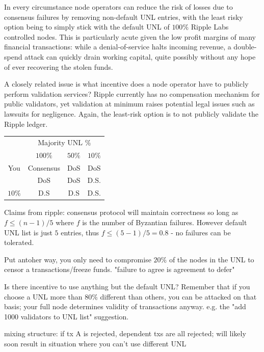 \documentclass{article}
\begin{document}
In every circumstance node operators can reduce the risk of losses due to
consensus failures by removing non-default UNL entries, with the least risky
option being to simply stick with the default UNL of $100\%$ Ripple Labs
controlled nodes. This is particularly acute given the low profit margins of
many financial transactions: while a denial-of-service halts incoming revenue,
a double-spend attack can quickly drain working capital, quite possibly without
any hope of ever recovering the stolen funds.

A closely related issue is what incentive does a node operator have to publicly
perform validation services? Ripple currently has no compensation mechanism for
public validators, yet validation at minimum raises potential legal issues such
as lawsuits for negligence. Again, the least-risk option is to not publicly
validate the Ripple ledger.

\begin{table}
    \begin{tabular}{c|c|c|c|}
        ~ & \multicolumn{3}{c}{Majority UNL \%} \\
        \multirow{3}{*}{You} & $100\%$ & $50\%$ & $10\%$ \\ \hline
        $100\%$ & Consensus & DoS & DoS \\ \hline
        $50\%$ & DoS & DoS & D.S. \\ \hline
        $10\%$ & D.S & D.S & D.S. \\
    \end{tabular}
\end{table}



Claims from ripple: consensus protocol\cite{ripple-consensus-paper} will maintain correctness so long as $f
\le (n-1)/5$ where $f$ is the number of Byzantian failures. However default UNL
list is just $5$ entries, thus $f \le (5-1)/5 = 0.8$ - no failures can be
tolerated.

Put antoher way, you only need to compromise $20\%$ of the nodes in the UNL to
censor a transactions/freeze funds. "failure to agree is agreement to defer"


Is there incentive to use anything but the default UNL? Remember that if you
choose a UNL more than $80\%$ different than others, you can be attacked on
that basis; your full node determines validity of transactions anyway. e.g. the
"add 1000 validators to UNL list" suggestion.

mixing structure: if tx A is rejected, dependent txs are all rejected; will
likely soon result in situation where you can't use different UNL
\end{document}
